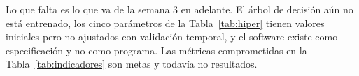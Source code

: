Lo que falta es lo que va de la semana 3 en adelante. El árbol de decisión aún no está entrenado, los cinco parámetros de la Tabla~\ref{tab:hiper} tienen valores iniciales pero no ajustados con validación temporal, y el software existe como especificación y no como programa. Las métricas comprometidas en la Tabla~\ref{tab:indicadores} son metas y todavía no resultados.
\fi
